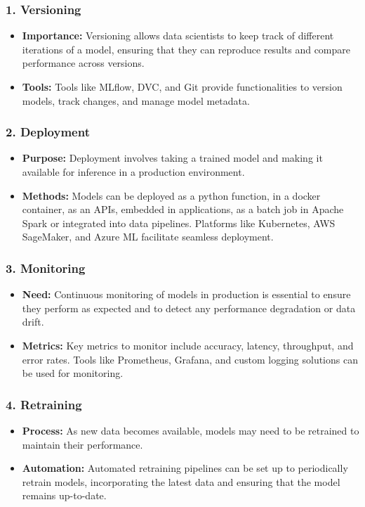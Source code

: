 \documentclass[letterpaper,12pt,notitlepage,twoside]{report}
\begin{document}
\subsubsection*{1. Versioning}
\begin{itemize}[noitemsep, topsep=0pt]
    \item \textbf{Importance:} Versioning allows data scientists to keep track of different iterations of a model, ensuring that they can reproduce results and compare performance across versions.
    \item \textbf{Tools:} Tools like MLflow, DVC, and Git provide functionalities to version models, track changes, and manage model metadata.
\end{itemize}

\subsubsection*{2. Deployment}
\begin{itemize}[noitemsep, topsep=0pt]
    \item \textbf{Purpose:} Deployment involves taking a trained model and making it available for inference in a production environment.
    \item \textbf{Methods:} Models can be deployed as a python function, in a docker container, as an APIs, embedded in applications, as a batch job in Apache Spark or integrated into data pipelines. Platforms like Kubernetes, AWS SageMaker, and Azure ML facilitate seamless deployment.
\end{itemize}

\subsubsection*{3. Monitoring}
\begin{itemize}[noitemsep, topsep=0pt]
    \item \textbf{Need:} Continuous monitoring of models in production is essential to ensure they perform as expected and to detect any performance degradation or data drift.
    \item \textbf{Metrics:} Key metrics to monitor include accuracy, latency, throughput, and error rates. Tools like Prometheus, Grafana, and custom logging solutions can be used for monitoring.
\end{itemize}

\subsubsection*{4. Retraining}
\begin{itemize}[noitemsep, topsep=0pt]
    \item \textbf{Process:} As new data becomes available, models may need to be retrained to maintain their performance.
    \item \textbf{Automation:} Automated retraining pipelines can be set up to periodically retrain models, incorporating the latest data and ensuring that the model remains up-to-date.
\end{itemize}
\end{document}

